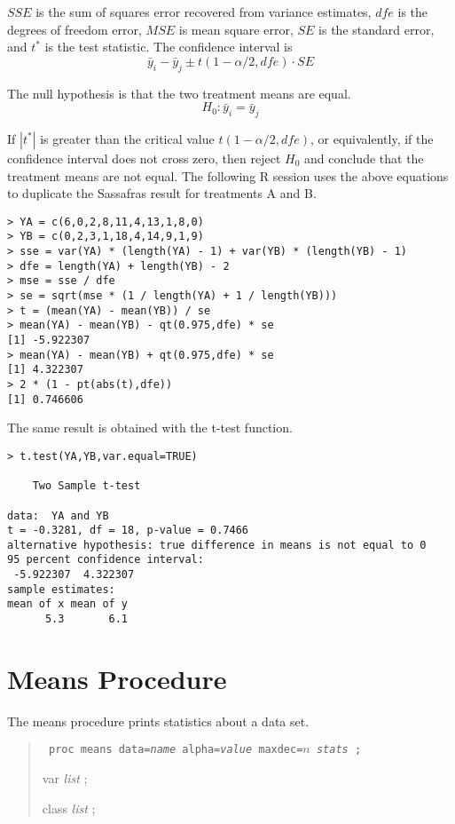 \documentclass[12pt]{article}
\begin{document}
$SSE$ is the sum of squares error recovered from
variance estimates, $dfe$ is the degrees of freedom error, $MSE$
is mean square error, $SE$ is the standard error, and $t^*$ is the
test statistic.
The confidence interval is
\[
\bar y_i-\bar y_j\pm t(1-\alpha/2,dfe)\cdot SE
\]

The null hypothesis is that the two treatment means are equal.
\[
H_0:\bar y_i=\bar y_j
\]

If $|t^*|$ is greater than the critical value $t(1-\alpha/2,dfe)$,
or equivalently, if the confidence interval does not cross zero,
then reject $H_0$ and conclude that the treatment means are not equal.
The following R session uses the above equations
to duplicate the Sassafras result for
treatments A and B.

{\footnotesize\begin{verbatim}
> YA = c(6,0,2,8,11,4,13,1,8,0)
> YB = c(0,2,3,1,18,4,14,9,1,9)
> sse = var(YA) * (length(YA) - 1) + var(YB) * (length(YB) - 1)
> dfe = length(YA) + length(YB) - 2
> mse = sse / dfe
> se = sqrt(mse * (1 / length(YA) + 1 / length(YB)))
> t = (mean(YA) - mean(YB)) / se
> mean(YA) - mean(YB) - qt(0.975,dfe) * se
[1] -5.922307
> mean(YA) - mean(YB) + qt(0.975,dfe) * se
[1] 4.322307
> 2 * (1 - pt(abs(t),dfe))
[1] 0.746606
\end{verbatim}}

The same result is obtained with the t-test function.

{\footnotesize\begin{verbatim}
> t.test(YA,YB,var.equal=TRUE)

	Two Sample t-test

data:  YA and YB
t = -0.3281, df = 18, p-value = 0.7466
alternative hypothesis: true difference in means is not equal to 0
95 percent confidence interval:
 -5.922307  4.322307
sample estimates:
mean of x mean of y 
      5.3       6.1 
\end{verbatim}}

\newpage

\section{Means Procedure}

The means procedure prints statistics about a data set.

\begin{quote}
{\tt
proc means data={\it name} alpha={\it value} maxdec=$n$ {\it stats} ;

var {\it list} ;

class {\it list} ;
}
\end{quote}
\end{document}
